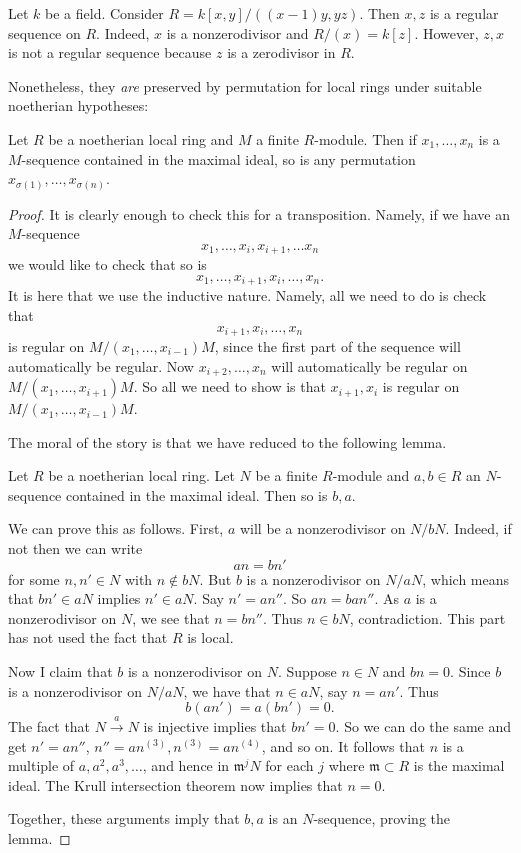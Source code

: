 \begin{example} Let $k $ be a field.
Consider $R=k[x,y]/((x-1)y, yz)$. Then $x,z$ is a regular sequence on $R$. Indeed,
$x$ is a nonzerodivisor and $R/(x) = k[z]$.  However, $z,
x$ is not a regular sequence because $z$ is a zerodivisor in $R$.
\end{example} 

Nonetheless, they \emph{are} preserved by permutation for local rings under
suitable noetherian hypotheses: 
\begin{proposition} 
Let $R$ be a noetherian local ring and $M$ a finite $R$-module. Then if $x_1,
\dots, x_n$ is a $M$-sequence contained in the maximal ideal, so is any permutation $x_{\sigma(1)}, \dots,
x_{\sigma(n)}$.
\end{proposition} 
\begin{proof} 
It is clearly enough to check this for a transposition. Namely, if we have an
$M$-sequence
\[ x_1, \dots, x_i, x_{i+1}, \dots x_n  \]
we would like to check that so is
\[ x_1, \dots, x_{i+1}, x_i, \dots, x_n.  \]
It is here that we use the inductive nature. Namely, all we need to do is check
that
\[ x_{i+1}, x_i, \dots,x_n  \]
is regular on $M/(x_1, \dots,x_{i-1}) M$, since the first part of the sequence
will automatically be regular. Now $x_{i+2}, \dots, x_n$ will automatically be
regular on $M/(x_1, \dots, x_{i+1})M$. So all we need to show is that
$x_{i+1}, x_i$ is regular on $M/(x_1, \dots, x_{i-1})M$.

The moral of the story is that we have reduced to the following lemma.

\begin{lemma} 
Let $R$ be a noetherian local ring. Let $N$
be a finite $R$-module and 
$a,b \in R$ an $N$-sequence contained in the maximal ideal. Then so is $b,a$.
\end{lemma} 
We can prove this as follows. First, $a$ will be a nonzerodivisor on $N/bN$.
Indeed, if not then we can write
\[ an = bn'  \]
for some $n,n' \in N$ with $n \notin bN$. But $b$ is a nonzerodivisor on
$N/aN$, which means that $bn' \in aN$ implies $n' \in aN$. Say $n' = an''$. So
$an = ba n''$. As $a$ is a nonzerodivisor on $N$, we see that $n = bn''$. Thus
$n \in bN$, contradiction.
This part has not used the fact that $R$ is local.

Now I claim that $b$ is a nonzerodivisor on $N$. Suppose $n \in N$ and $bn =
0$. Since $b$ is a nonzerodivisor on $N/aN$, we have that $n \in aN$, say $n =
an'$. Thus 
\[ b(an') = a(bn') = 0.  \]
The fact that $N \stackrel{a}{\to} N$ is injective implies that $bn' = 0$. So
we can do the same and get $n' = an''$, $n'' = a n^{(3)}, n^{(3)} =a n^{(4)}$, and
so on. It follows that $n$ is a multiple of $a, a^2,a^3, \dots$, and hence in
$\mathfrak{m}^j N$ for each $j$ where $\mathfrak{m} \subset R$ is the maximal
ideal. The Krull intersection theorem now implies that $n = 0$. 

Together, these arguments imply that $b,a$ is an $N$-sequence, proving the
lemma.
\end{proof} 


